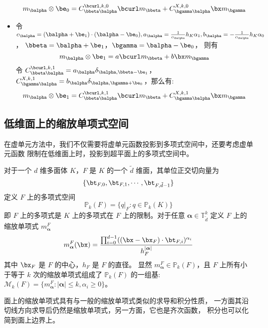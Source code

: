 \begin{property}
\begin{itemize}
            $$
            m_{\balpha}\otimes \be_0 =
            C^{\bcurl, k, 0}_{\bbeta\balpha}
            \bcurl m_{\bbeta} + C^{X, k, 0}_{\bgamma\balpha}
            \bx m_{\bgamma}
            $$
        \item 令 $c_{\balpha} = (\balpha + \be_1)\cdot(\balpha-\be_0),
            a_{\balpha} = \frac{1}{c_{\balpha}}h_K\alpha_1,
            b_{\balpha} = -\frac{1}{c_{\balpha}}h_K\alpha_0$，
            $\bbeta = \balpha + \be_1$，$\bgamma = \balpha - \be_0$，
            则有
            $$
            m_{\balpha}\otimes \be_1 = a \bcurl m_{\bbeta} +
            b\bx m_{\bgamma}
            $$
            令 $C^{\bcurl, k, 1}_{\bbeta\balpha} = a_{\balpha}\delta_{\balpha,
            \bbeta-\be_1}$，
            $C^{X, k, 1}_{\bgamma\balpha} =
            b_{\balpha}\delta_{\balpha, \bgamma+\be_0}$，那么有:
            $$
            m_{\balpha}\otimes \be_1 =
            C^{\bcurl, k, 1}_{\bbeta\balpha}
            \bcurl m_{\bbeta} + C^{X, k, 1}_{\bgamma\balpha}
            \bx m_{\bgamma}
            $$
    \end{itemize}
\end{property}

 
\subsection{低维面上的缩放单项式空间} 
在虚单元方法中，我们不仅需要将虚单元函数投影到多项式空间中，还要考虑虚单元函数
限制在低维面上时，投影到超平面上的多项式空间中。

对于一个
$d$ 维多面体 $K$，$F$ 是 $K$ 的一个 $\tilde{d}$ 维面，其单位正交切向量为 
$$
\{\bt_{F, 0}, \bt_{F, 1}, \cdots, \bt_{F, \tilde{d}-1}\}
$$
定义 $F$ 上的多项式空间
$$
\mathbb{P}_k(F) = \{q|_F : q \in \mathbb{P}_k(K)\}
$$
即 $F$ 上的多项式是 $K$ 上的多项式在 $F$ 上的限制。对于任意 $\boldsymbol{\alpha}
\in \mathbb{T}_{\tilde{d}}^k$ 定义 $F$ 上的缩放单项式 $m^F_{\boldsymbol{\alpha}}$ 
$$
m^F_{\boldsymbol{\alpha}}(\bx) = \frac{
\prod_{i=0}^{d-1}((\bx-\bx_F)\cdot
\bt_{F, i})^{\alpha_i}}
{h^{|\boldsymbol{\alpha}|}_F}
$$
其中 $\bx_F$ 是 $F$ 的中心，$h_F$ 是 $F$ 的直径。
显然 $m^F_{\boldsymbol{\alpha}} \in \mathbb{P}_k(F)$，且 $F$
上所有小于等于 $k$ 次的缩放单项式组成了 $\mathbb{P}_k(F)$ 的一组基:
$\mathcal{M}_k(F) = \{m^F_{\boldsymbol{\alpha}}: |\boldsymbol{\alpha}|\le k,
\alpha_i \ge 0\}$。

面上的缩放单项式具有与一般的缩放单项式类似的求导和积分性质，
一方面其沿切线方向求导后仍然是缩放单项式，另一方面，它也是齐次函数，
积分也可以化简到面上边界上。

